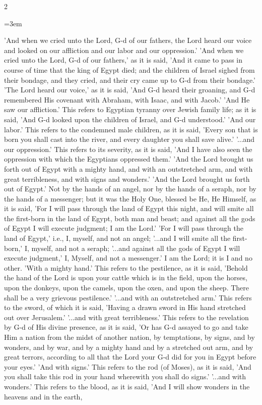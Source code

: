\documentclass[11pt, openany]{book}
\newcommand{\sederdivider}{%
  \par\vspace{6pt}
  \begin{center}
    \textcolor{sedergold}{\pgfornament[width=1.5cm]{11}}
  \end{center}
  \par\vspace{6pt}
}
\newenvironment{bilingual}{%
  \par\vspace{4pt}%
  \begin{paracol}{2}%
}{%
  \end{paracol}%
  \par\vspace{2pt}%
}
\newenvironment{englishcol}{%
  \switchcolumn[0]%
  \begingroup
  \setstretch{1.4}%
  \emergencystretch=3em
  \tolerance=9999
  \normalsize
  \rightskip=0.12in\relax
}{%
  \endgroup
}
\begin{document}
\begin{bilingual}
\begin{englishcol}
'And when we cried unto the Lord, G-d of our fathers, the Lord heard our voice and looked on our affliction and our labor and our oppression.' 'And when we cried unto the Lord, G-d of our fathers,' as it is said, 'And it came to pass in course of time that the king of Egypt died; and the children of Israel sighed from their bondage, and they cried, and their cry came up to G-d from their bondage.'
'The Lord heard our voice,' as it is said, 'And G-d heard their groaning, and G-d remembered His covenant with Abraham, with Isaac, and with Jacob.'
'And He saw our affliction.' This refers to Egyptian tyranny over Jewish family life; as it is said, 'And G-d looked upon the children of Israel, and G-d understood.'
'And our labor.' This refers to the condemned male children, as it is said, 'Every son that is born you shall cast into the river, and every daughter you shall save alive.' '...and our oppression.' This refers to its severity, as it is said, 'And I have also seen the oppression with which the Egyptians oppressed them.'
'And the Lord brought us forth out of Egypt with a mighty hand, and with an outstretched arm, and with great terribleness, and with signs and wonders.' 'And the Lord brought us forth out of Egypt.' Not by the hands of an angel, nor by the hands of a seraph, nor by the hands of a messenger; but it was the Holy One, blessed be He, He Himself, as it is said, 'For I will pass through the land of Egypt this night, and will smite all the first-born in the land of Egypt, both man and beast; and against all the gods of Egypt I will execute judgment; I am the Lord.' 'For I will pass through the land of Egypt,' i.e., I, myself, and not an angel; '...and I will smite all the first-born,' I, myself, and not a seraph; '...and against all the gods of Egypt I will execute judgment,' I, Myself, and not a messenger.' I am the Lord; it is I and no other.
'With a mighty hand.' This refers to the pestilence, as it is said, 'Behold the hand of the Lord is upon your cattle which is in the field, upon the horses, upon the donkeys, upon the camels, upon the oxen, and upon the sheep. There shall be a very grievous pestilence.' '...and with an outstretched arm.' This refers to the sword, of which it is said, 'Having a drawn sword in His hand stretched out over Jerusalem.' '...and with great terribleness.' This refers to the revelation by G-d of His divine presence, as it is said, 'Or has G-d assayed to go and take Him a nation from the midst of another nation, by temptations, by signs, and by wonders, and by war, and by a mighty hand and by a stretched out arm, and by great terrors, according to all that the Lord your G-d did for you in Egypt before your eyes.'
'And with signs.' This refers to the rod (of Moses), as it is said, 'And you shall take this rod in your hand wherewith you shall do signs.' '...and with wonders.' This refers to the blood, as it is said, 'And I will show wonders in the heavens and in the earth,
\end{englishcol}
\end{bilingual}
\sederdivider
\end{document}
